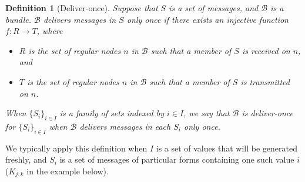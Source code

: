 \documentclass[copyright]{eptcs}
\newcommand{\bnd}{\mathcal{B}}
\newtheorem{definition}{Definition}
\begin{document}
\begin{definition}[Deliver-once] Suppose that $S$ is a set of
  messages, and $\bnd$ is a bundle.  $\bnd$ \emph{delivers messages
    in} $S$ \emph{only once} if  there exists an injective
  function $f\colon R\rightarrow T$, where
\begin{itemize}
  \item $R$ is the set of regular nodes $n$ in $\bnd$ such that a
    member of $S$ is received on $n$, and
  \item $T$ is the set of regular nodes $n$ in $\bnd$ such that a
    member of $S$ is transmitted on $n$.
  \end{itemize} 
When $\{S_i\}_{i\in I}$ is a family of sets indexed by $i\in I$, we
  say that $\bnd$ is \emph{deliver-once} for $\{S_i\}_{i\in I}$ when
  $\bnd$ delivers messages in each $S_i$ only once.
\end{definition} 
We typically apply this definition when $I$ is a set of values that
will be generated freshly, and $S_i$ is a set of messages of
particular forms containing one such value $i$ ($K_{j,k}$ in the
example below).
\end{document}

